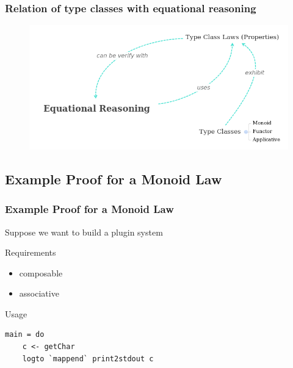 \documentclass{beamer}
\begin{document}
\begin{frame}
\frametitle{Relation of type classes with equational reasoning}
  \begin{figure}
  \centering
     \includegraphics[scale=0.4]{mindmap}
\end{figure}
\end{frame}

\lstset{
basicstyle=\ttfamily,
columns=fullflexible,
keepspaces=true,
captionpos=b
}

\subsection{Example Proof for a Monoid Law }

\begin{frame}[fragile]
\frametitle{Example Proof for a Monoid Law}
  Suppose we want to build a plugin system

\begin{block}{Requirements}
\begin{itemize}
\item composable
\item associative
\end{itemize}
\end{block}

\begin{block}{Usage}
\begin{verbatim}
main = do
    c <- getChar
    logto `mappend` print2stdout c
\end{verbatim}
\end{block}
\end{frame}
\end{document}
